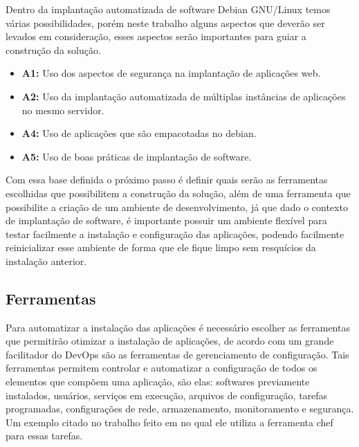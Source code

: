 Dentro da implantação automatizada de software Debian GNU/Linux temos várias
possibilidades, porém neste trabalho alguns aspectos que deverão ser levados em
consideração, esses aspectos serão importantes para guiar a construção da solução.

\begin{itemize}
  \item  \textbf{A1:} Uso dos aspectos de segurança na implantação de aplicações web.
  \item  \textbf{A2:} Uso da implantação automatizada de múltiplas instâncias de
   aplicações no mesmo servidor.
  \item  \textbf{A4:} Uso de aplicações que são empacotadas no debian.
  \item  \textbf{A5:} Uso de boas práticas de implantação de software.
\end{itemize}

Com essa base definida o próximo passo é definir quais serão as ferramentas
escolhidas que possibilitem a construção da solução, além de uma ferramenta
que possibilite a criação de um ambiente de desenvolvimento, já que dado o
contexto de implantação de software, é importante possuir um ambiente flexível
para testar facilmente a instalação e configuração das aplicações,
podendo facilmente reinicializar esse ambiente de forma que ele fique limpo sem
resquícios da instalação anterior.

\subsection{Ferramentas}

Para automatizar a instalação das aplicações é necessário escolher as ferramentas
que permitirão otimizar a instalação de aplicações, de acordo com \cite{6265084}
um grande facilitador do DevOps são as ferramentas de gerenciamento de configuração.
Tais ferramentas permitem controlar e automatizar a configuração de todos os
elementos que compõem uma aplicação, são elas: softwares previamente instalados,
usuários, serviços em execução, arquivos de configuração, tarefas programadas,
configurações de rede, armazenamento, monitoramento e segurança. Um exemplo citado
no trabalho feito em \cite{leo2014} no qual ele utiliza a ferramenta chef para
essas tarefas.

